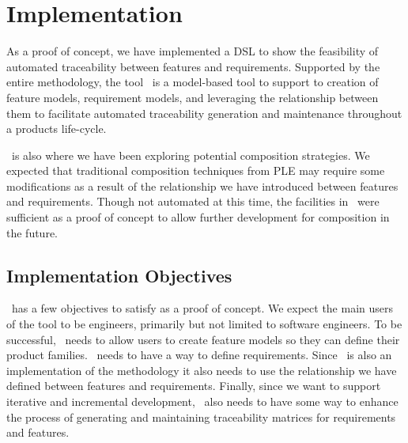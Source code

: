 \chapter{Implementation}

As a proof of concept, we have implemented a \ac{DSL} to show the feasibility of automated traceability between features and requirements. Supported by the entire methodology, the tool \tool\ is a model-based tool to support to creation of feature models, requirement models, and leveraging the relationship between them to facilitate automated traceability generation and maintenance throughout a products life-cycle.

\tool\ is also where we have been exploring potential composition strategies. We expected that traditional composition techniques from \ac{PLE} may require some modifications as a result of the relationship we have introduced between features and requirements. Though not automated at this time, the facilities in \tool\ were sufficient as a proof of concept to allow further development for composition in the future.

\section{Implementation Objectives}

\tool\ has a few objectives to satisfy as a proof of concept. We expect the main users of the tool to be engineers, primarily but not limited to software engineers. To be successful, \tool\ needs to allow users to create feature models so they can define their product families. \tool\ needs to have a way to define requirements. Since \tool\ is also an implementation of the methodology it also needs to use the relationship we have defined between features and requirements. Finally, since we want to support iterative and incremental development, \tool\ also needs to have some way to enhance the process of generating and maintaining traceability matrices for requirements and features. 

